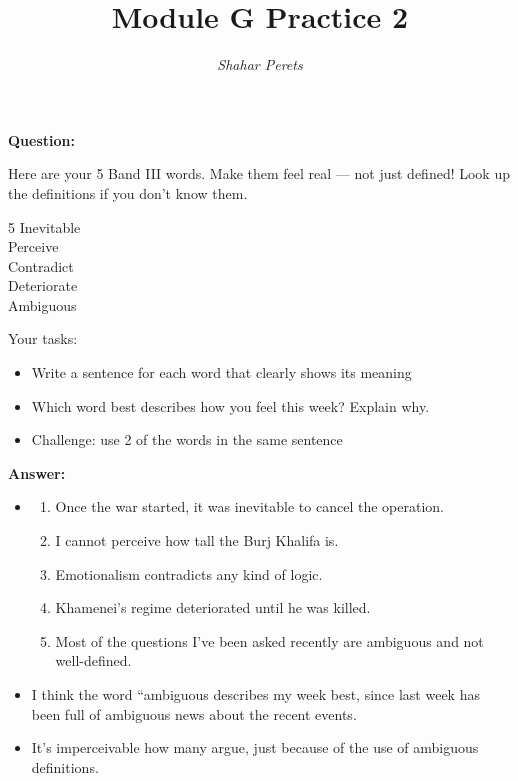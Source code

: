 \documentclass[]{../../../tex/classes/styledArticle}
\author{\textit{Shahar Perets}}
\title{Module G Practice 2}
\begin{document}
	\maketitle
	
	\large
	
	\section{}
	\textbf{Question:}
	
	Here are your 5 Band III words. Make them feel real — not just defined! Look up the definitions if you don’t know them.
	\begin{center}
		\begin{multicols}{5}
			Inevitable  \\
			Perceive    \\
			Contradict  \\
			Deteriorate \\
			Ambiguous
		\end{multicols}
	\end{center}
	Your tasks:
	\begin{itemize}
		\item Write a sentence for each word that clearly shows its meaning
		\item Which word best describes how you feel this week? Explain why.
		\item Challenge: use 2 of the words in the same sentence
	\end{itemize}
	
	\textbf{Answer: }
	\begin{itemize}
		\item 
		\begin{enumerate}
			\item Once the war started, it was inevitable to cancel the operation.  
			\item I cannot perceive how tall the Burj Khalifa is. 
			\item Emotionalism contradicts any kind of logic. 
			\item Khamenei's regime deteriorated until he was killed. 
			\item Most of the questions I've been asked recently are ambiguous and not well-defined. 
		\end{enumerate}
		\item I think the word ``ambiguous describes my week best, since last week has been full of ambiguous news about the recent events. 
		\item It's imperceivable how many argue, just because of the use of ambiguous definitions. 
	\end{itemize}
	
\end{document}
